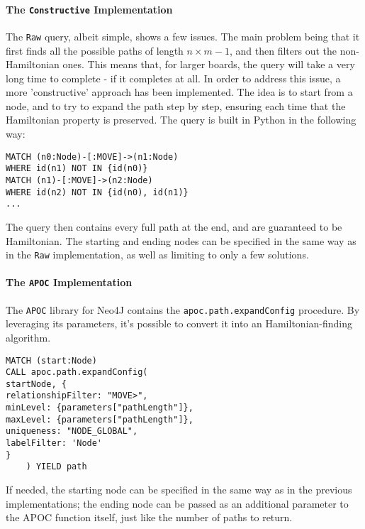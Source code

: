 \documentclass[conference]{IEEEtran}
\begin{document}
\paragraph{The \texttt{Constructive} Implementation}
The \texttt{Raw} query, albeit simple, shows a few issues. The main problem being that it first finds all the possible paths of length $n \times m - 1$, and then filters out the non-Hamiltonian ones. This means that, for larger boards, the query will take a very long time to complete - if it completes at all.
In order to address this issue, a more 'constructive' approach has been implemented. The idea is to start from a node, and to try to expand the path step by step, ensuring each time that the Hamiltonian property is preserved.
The query is built in Python in the following way:
\begin{tcolorbox}[colback=yellow!5!white, colframe=yellow!50!black]
\begin{verbatim}
MATCH (n0:Node)-[:MOVE]->(n1:Node)
WHERE id(n1) NOT IN {id(n0)}
MATCH (n1)-[:MOVE]->(n2:Node)
WHERE id(n2) NOT IN {id(n0), id(n1)}
...
\end{verbatim}
\end{tcolorbox}

The query then contains every full path at the end, and are guaranteed to be Hamiltonian.
The starting and ending nodes can be specified in the same way as in the \texttt{Raw} implementation, as well as limiting to only a few solutions.

\paragraph{The \texttt{APOC} Implementation}
The \texttt{APOC} library \cite{apoc} for Neo4J contains the \texttt{apoc.path.expandConfig} procedure. By leveraging its parameters, it's possible to convert it into an Hamiltonian-finding algorithm.
\begin{tcolorbox}[colback=yellow!5!white, colframe=yellow!50!black]
\begin{verbatim}
MATCH (start:Node)
CALL apoc.path.expandConfig(
startNode, {
relationshipFilter: "MOVE>",
minLevel: {parameters["pathLength"]},
maxLevel: {parameters["pathLength"]},
uniqueness: "NODE_GLOBAL",
labelFilter: 'Node'
}
    ) YIELD path
\end{verbatim}
\end{tcolorbox}

If needed, the starting node can be specified in the same way as in the previous implementations; the ending node can be passed as an additional parameter to the APOC function itself, just like the number of paths to return.
\end{document}
